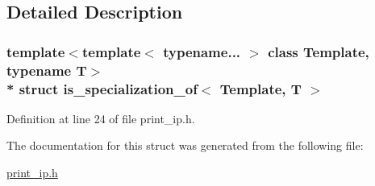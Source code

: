 \subsection{Detailed Description}
\subsubsection*{template$<$template$<$ typename... $>$ class Template, typename T$>$\\*
struct is\+\_\+specialization\+\_\+of$<$ Template, T $>$}



Definition at line 24 of file print\+\_\+ip.\+h.



The documentation for this struct was generated from the following file\+:\begin{DoxyCompactItemize}
\item 
\hyperlink{print__ip_8h}{print\+\_\+ip.\+h}\end{DoxyCompactItemize}
